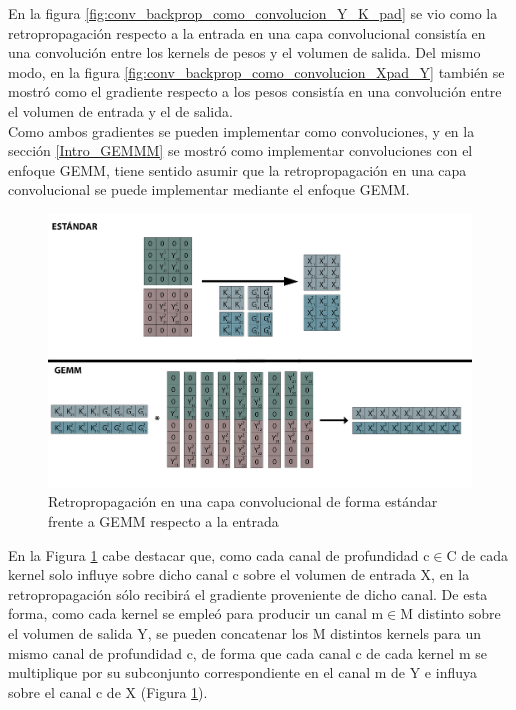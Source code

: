 En la figura \ref{fig:conv_backprop_como_convolucion_Y_K_pad} se vio como la retropropagación respecto a la entrada en una capa convolucional consistía en una convolución entre los kernels de pesos y el volumen de salida. Del mismo modo, en la figura \ref{fig:conv_backprop_como_convolucion_Xpad_Y} también se mostró como el gradiente respecto a los pesos consistía en una convolución entre el volumen de entrada y el de salida. \\
Como ambos gradientes se pueden implementar como convoluciones, y en la sección \ref{Intro_GEMMM} se mostró como implementar convoluciones con el enfoque GEMM, tiene sentido asumir que la retropropagación en una capa convolucional se puede implementar mediante el enfoque GEMM.

\begin{figure}[H]
	\hspace{-38mm}
	\includegraphics[scale=0.3]{imagenes/conv_std_vs_gemm_backprop.jpg}  
	\caption{Retropropagación en una capa convolucional de forma estándar frente a GEMM respecto a la entrada}
	\label{fig:conv_std_vs_gemm_backprop}
\end{figure}

En la Figura \ref{fig:conv_std_vs_gemm_backprop} cabe destacar que, como cada canal de profundidad c$\in$C de cada kernel solo influye sobre dicho canal c sobre el volumen de entrada X, en la retropropagación sólo recibirá el gradiente proveniente de dicho canal. De esta forma, como cada kernel se empleó para producir un canal m$\in$M distinto sobre el volumen de salida Y, se pueden concatenar los M distintos kernels para un mismo canal de profundidad c, de forma que cada canal c de cada kernel m se multiplique por su subconjunto correspondiente en el canal m de Y e influya sobre el canal c de X (Figura \ref{fig:conv_std_vs_gemm_backprop}). 

